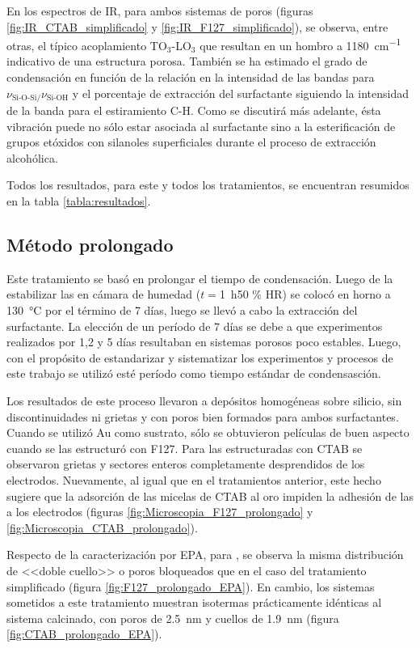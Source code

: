 {			 En los espectros de IR, para ambos sistemas de poros (figuras \ref{fig:IR_CTAB_simplificado} y \ref{fig:IR_F127_simplificado}), se observa, entre otras, el típico acoplamiento TO$_3$-LO$_3$ que resultan en un hombro a \SI{1180}{\cm^{-1}}} indicativo de una estructura porosa\cite{Innocenzi2003}. También se ha estimado el grado de condensación en función de la relación en la intensidad de las bandas para $\nu_{\text{Si-O-Si/}}\nu_{\text{Si-OH}}$ y el porcentaje de extracción del surfactante siguiendo la intensidad de la banda para el estiramiento C-H. Como se discutirá más adelante, ésta vibración puede no sólo estar asociada al surfactante sino a la esterificación de grupos etóxidos con silanoles superficiales durante el proceso de extracción alcohólica.

			 Todos los resultados, para este y todos los tratamientos, se encuentran resumidos en la tabla \ref{tabla:resultados}.

	 \subsection{Método prolongado}

	 	 Este tratamiento se basó en prolongar el tiempo de condensación. Luego de la estabilizar las \pdm\space en cámara de humedad ($t=$\SI{1}{\hour}50 \% HR) se colocó en horno a \SI{130}{\celsius} por el término de 7 días, luego se llevó a cabo la extracción del surfactante. La elección de un período de 7 días se debe a que experimentos realizados por 1,2 y 5 días resultaban en sistemas porosos poco estables. Luego, con el propósito de estandarizar y sistematizar los experimentos y procesos de este trabajo se utilizó esté período como tiempo estándar de condensasción.

	 	 Los resultados de este proceso llevaron a depósitos homogéneas sobre silicio, sin discontinuidades ni grietas y con poros bien formados para ambos surfactantes. Cuando se utilizó Au como sustrato, sólo se obtuvieron películas de buen aspecto cuando se las estructuró con F127. Para las estructuradas con CTAB se observaron grietas y sectores enteros completamente desprendidos de los electrodos. Nuevamente, al igual que en el tratamientos anterior, este hecho sugiere que la adsorción de las micelas de CTAB al oro impiden la adhesión de las \pdmC\space a los electrodos (figuras \ref{fig:Microscopia_F127_prolongado} y \ref{fig:Microscopia_CTAB_prolongado}).

	 	 Respecto de la caracterización por EPA, para \pdmF, se observa la misma distribución de <<doble cuello>> o poros bloqueados que en el caso del tratamiento simplificado (figura \ref{fig:F127_prolongado_EPA}). En cambio, los sistemas \pdmC\space sometidos a este tratamiento muestran isotermas prácticamente idénticas al sistema calcinado, con poros de \SI{2,5}{\nm} y cuellos de \SI{1,9}{\nm} (figura \ref{fig:CTAB_prolongado_EPA}).

